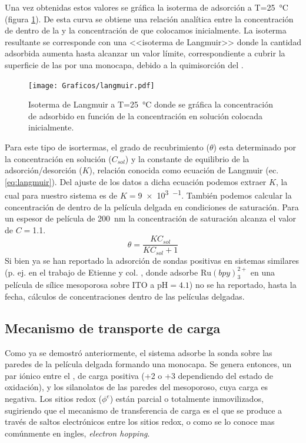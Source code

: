 		Una vez obtenidas estos valores se gráfica la isoterma de adsorción a T=\SI{25}{\celsius} (figura \ref{fig:langmuir}). De esta curva se obtiene una relación analítica entre la concentración de \ru\space dentro de la \pdm\space y la concentración de \ru\space que colocamos inicialmente. La isoterma resultante se corresponde con una <<isoterma de Langmuir>> donde la cantidad adsorbida aumenta hasta alcanzar un valor límite, correspondiente a cubrir la superficie de las \pdm\space por una monocapa, debido a la quimisorción del \ru.\cite{langmuir1918}

			\begin{figure}[ht]
					\centering
			 	    \texttt{[image: Graficos/langmuir.pdf]}
			        \caption[Isoterma de Langmuir]{Isoterma de Langmuir a T=\SI{25}{\celsius} donde se gráfica la concentración de \aminorutenio\space adsorbido en función de la concentración en solución colocada inicialmente.}
			        \label{fig:langmuir}
			      	\end{figure} 	
	
		Para este tipo de isortermas, el grado de recubrimiento ($\theta$) esta determinado por la concentración en solución ($C_{sol}$) y la constante de equilibrio de la adsorción/desorción ($K$), relación conocida como ecuación de Langmuir (ec. \ref{eq:langmuir}).  Del ajuste de los datos a dicha ecuación podemos extraer $K$, la cual para nuestro sistema es de $K=$\SI{9e3}{\Molar^{-1}}. También podemos calcular la concentración de \ru\space dentro de la película delgada en condiciones de saturación. Para un espesor de película de \SI{200}{nm} la concentración de saturación alcanza el valor de $C\!=$\SI{1.1}{\Molar}.
			\begin{equation}
					\theta = \frac{KC_{sol}}{KC_{sol}+1}
					\label{eq:langmuir}
			\end{equation}
		Si bien ya se han reportado la adsorción de sondas positivas en sistemas similares (p. ej. en el trabajo de Etienne y col. \cite{Etienne2007}, donde adsorbe $\text{Ru}(bpy)_3^{2+}$ en una película de sílice mesoporosa sobre ITO a $\text{pH}=4.1$) no se ha reportado, hasta la fecha, cálculos de concentraciones dentro de las películas delgadas.

	\subsection{Mecanismo de transporte de carga}

	 	 Como ya se demostró anteriormente, el sistema adsorbe la sonda sobre las paredes de la película delgada formando una monocapa. Se genera entonces, un par iónico entre el \ru, de carga positiva (+2 o +3 dependiendo del estado de oxidación), y los silanolatos de las paredes del mesoporoso, cuya carga es negativa. Los sitios redox ($\phi^{e}$) están parcial o totalmente inmovilizados, sugiriendo que el mecanismo de transferencia de carga es el que se produce a través de saltos electrónicos entre los sitios redox, o como se lo conoce mas comúnmente en ingles, \textit{electron hopping}. \cite{Rohlfing2005,Vila2015,Audebert2015}

